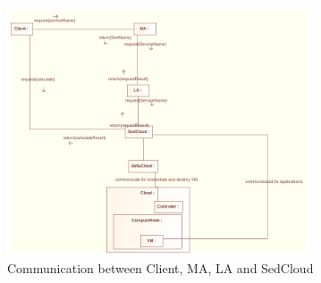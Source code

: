 \begin{figure}[!htb]
  \centering
  \includegraphics[width=0.8\textwidth]{fig/communicationDiagramSedCloud.png}
  \caption{Communication between Client, MA, LA and SedCloud} \label{fig:SedCloudcommunication}
\end{figure}